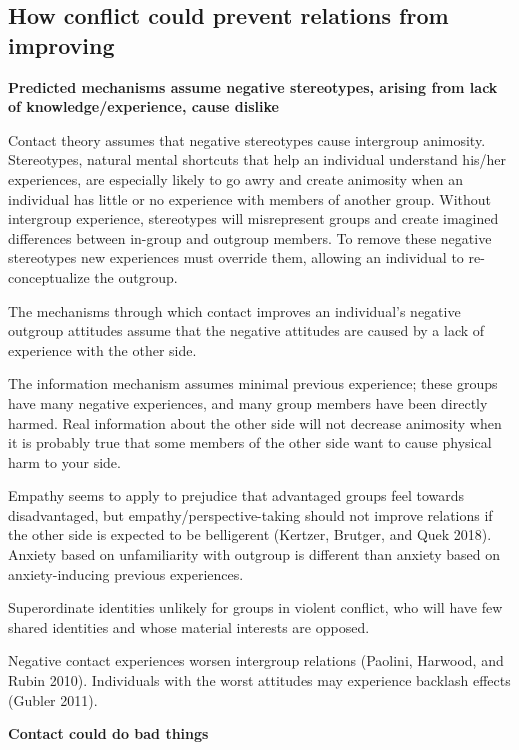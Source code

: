 \documentclass[11pt]{article}
\begin{document}
\hypertarget{how-conflict-could-prevent-relations-from-improving}{%
\subsection{How conflict could prevent relations from
improving}\label{how-conflict-could-prevent-relations-from-improving}}

\textbf{Predicted mechanisms assume negative stereotypes, arising from
lack of knowledge/experience, cause dislike}

Contact theory assumes that negative stereotypes cause intergroup
animosity. Stereotypes, natural mental shortcuts that help an individual
understand his/her experiences, are especially likely to go awry and
create animosity when an individual has little or no experience with
members of another group. Without intergroup experience, stereotypes
will misrepresent groups and create imagined differences between
in-group and outgroup members. To remove these negative stereotypes new
experiences must override them, allowing an individual to re-
conceptualize the outgroup.

The mechanisms through which contact improves an individual's negative
outgroup attitudes assume that the negative attitudes are caused by a
lack of experience with the other side.

The information mechanism assumes minimal previous experience; these
groups have many negative experiences, and many group members have been
directly harmed. Real information about the other side will not decrease
animosity when it is probably true that some members of the other side
want to cause physical harm to your side.

Empathy seems to apply to prejudice that advantaged groups feel towards
disadvantaged, but empathy/perspective-taking should not improve
relations if the other side is expected to be belligerent (Kertzer,
Brutger, and Quek 2018). Anxiety based on unfamiliarity with outgroup is
different than anxiety based on anxiety-inducing previous experiences.

Superordinate identities unlikely for groups in violent conflict, who
will have few shared identities and whose material interests are
opposed.

Negative contact experiences worsen intergroup relations (Paolini,
Harwood, and Rubin 2010). Individuals with the worst attitudes may
experience backlash effects (Gubler 2011).

\textbf{Contact could do bad things}
\end{document}
